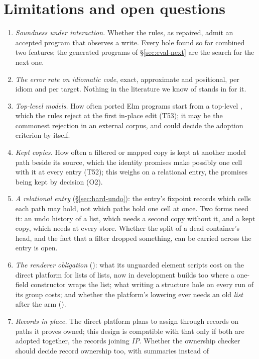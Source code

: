 \section{Limitations and open questions}
\label{sec:disc-open}

\begin{enumerate}
\item \emph{Soundness under interaction.} Whether the rules, as repaired, admit an accepted program that
observes a write. Every hole found so far combined two features; the generated programs of
\S\ref{sec:eval-next} are the search for the next one.
\item \emph{The error rate on idiomatic code}, exact, approximate and positional, per idiom and per target.
Nothing in the literature we know of stands in for it.
\item \emph{Top-level models.} How often ported Elm programs start from a top-level ,
which the rules reject at the first in-place edit (T53); it may be the commonest rejection in an external
corpus, and could decide the adoption criterion by itself.
\item \emph{Kept copies.} How often a filtered or mapped copy is kept at another model path beside its
source, which the identity promises make possibly one cell with it at every entry (T52); this weighs on
a relational entry, the promises being kept by decision (O2).
\item \emph{A relational entry} (\S\ref{sec:hard-undo}): the entry's fixpoint records which cells each path
may hold, not which paths hold one cell at once. Two forms need it: an undo history of a list, which needs
a second copy without it, and a kept copy, which needs  at every store. Whether the split
of a dead container's head, and the fact that a filter dropped something, can be carried across the entry
is open.
\item \emph{The renderer obligation} (): what its unguarded element scripts cost on the direct
platform for lists of lists, now in development builds too where a one-field constructor wraps the list;
what writing a structure hole on every run of its group costs; and whether the platform's lowering ever
needs an old \emph{list} after the arm ().
\item \emph{Records in place.} The direct platform plans to assign through records on paths it proves
owned; this design is compatible with that only if both are adopted together, the records joining
$\mathit{IP}$. Whether the ownership checker should decide record ownership too, with summaries instead of

\end{enumerate}

